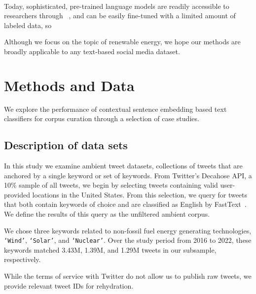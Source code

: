 \cite{gao2021limitations}\cite{chang2020taming}


~\cite{antypas2022twitter} ~\cite{quercia2012tweetlda}


Today, sophisticated, pre-trained language models are readily accessible to researchers through ~\cite{wolf2020transformers}, and can be easily fine-tuned with a limited amount of labeled data, so ~\cite{yan2018few,wang2020generalizing}

\cite{kim2020exploring, jain2019sentiment}


Although we focus on the topic of renewable energy, we hope our methods are broadly applicable
to any text-based social media dataset.

\section{Methods and Data}
\label{sec:corpusCreation.methods}



We explore the performance of contextual sentence embedding based text classifiers for corpus curation through a selection of case studies. 


\subsection{Description of data sets}
\label{sec:corpusCreation.data}

In this study we examine ambient tweet datasets,
collections of tweets that are anchored by a single keyword or set of keywords. 
From Twitter's Decahose API,
a 10\% sample of all tweets,
we begin by selecting tweets containing valid user-provided locations in the United States. 
From this selection, we query for tweets that both contain keywords of choice and are classified as English by FastText~\cite{joulin2017bag}.
We define the results of this query as the unfiltered ambient corpus.

We chose three keywords related to non-fossil fuel energy generating technologies, \texttt{`Wind'}, \texttt{`Solar'}, and \texttt{`Nuclear'}. 
Over the study period from 2016 to 2022, these keywords matched 3.43M, 1.39M, and 1.29M tweets in our subsample, respectively.

While the terms of service with Twitter do not allow us to publish raw tweets, we provide relevant tweet IDs for rehydration. 

